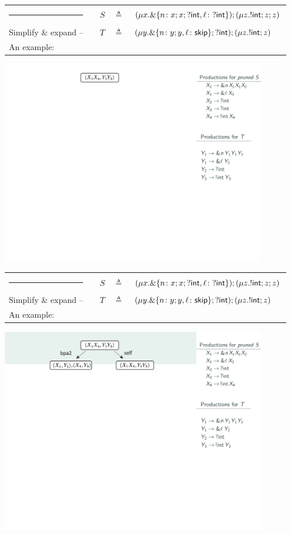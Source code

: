 \documentclass[10pt]{beamer}
\begin{document}
\newcommand{\typeA}{\semiT {(\recT x \choiceExtT {n\colon {\semiT x {\semiT
          x{\msgInT\intk}}}, \ell \colon \msgInT\intk})} {(\recT z
    {\semiT{\msgOutT\intk}{\semiT zz}})}}
\newcommand{\typeB}{\semiT {(\semiT {\recT y {\choiceExtT {n\colon\semiT yy,
          \ell\colon\skipk}}}{\msgInT\intk)}}{(\recT z \semiT{\msgOutT\intk}z)}}

\newcommand{\header}[2]{
    \footnotesize
    \setlength\tabcolsep{4pt}
    \vskip 0.2cm
	\begin{tabular} {l l l l l }    
      {\color{teal}\rule{3cm}{2pt}} &\hfill\hspace{1.5cm} & $S$ & $\triangleq$ &  $\typeA$\\
      {\color{teal} #1}             &\hfill & $T$ & $\triangleq$ &  $\typeB$\\
      {\color{teal} #2}             &\hfill &     &              &\\
	\end{tabular}
	\vspace*{2mm}
    \normalsize
}

\begin{frame}
    \header{Simplify \& expand --}{An example:}
	\includegraphics[width=11.5cm]{img/exemplo-9}\smallskip
\end{frame}

\begin{frame}
	\header{Simplify \& expand --}{An example:}
	\includegraphics[width=11.5cm]{img/exemplo-8}\smallskip
\end{frame}
\end{document}
